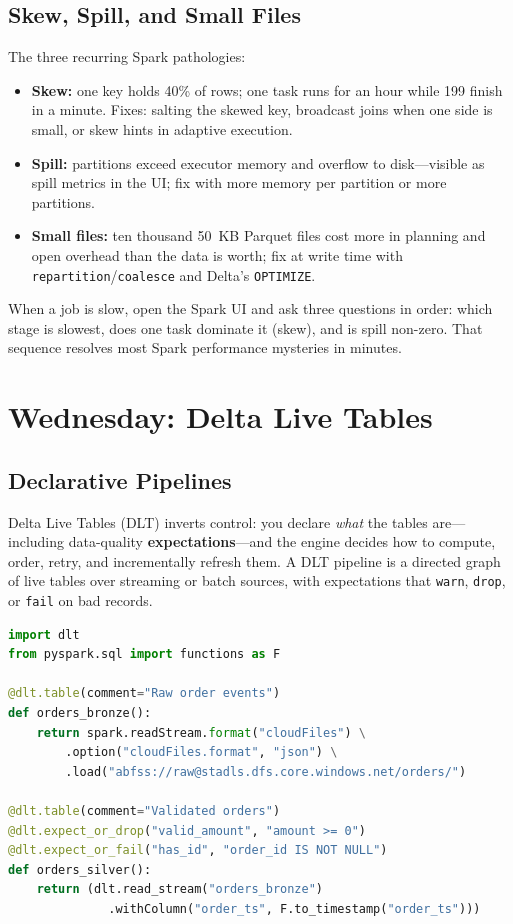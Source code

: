 \subsection{Skew, Spill, and Small Files}
The three recurring Spark pathologies:
\begin{itemize}
    \item \textbf{Skew:} one key holds 40\% of rows; one task runs for an hour while 199 finish in a minute. Fixes: salting the skewed key, broadcast joins when one side is small, or skew hints in adaptive execution.
    \item \textbf{Spill:} partitions exceed executor memory and overflow to disk---visible as spill metrics in the UI; fix with more memory per partition or more partitions.
    \item \textbf{Small files:} ten thousand 50~KB Parquet files cost more in planning and open overhead than the data is worth; fix at write time with \texttt{repartition}/\texttt{coalesce} and Delta's \texttt{OPTIMIZE}.
\end{itemize}

\begin{tipbox}
When a job is slow, open the Spark UI and ask three questions in order: which stage is slowest, does one task dominate it (skew), and is spill non-zero. That sequence resolves most Spark performance mysteries in minutes.
\end{tipbox}

\section{Wednesday: Delta Live Tables}

\subsection{Declarative Pipelines}
Delta Live Tables (DLT) inverts control: you declare \emph{what} the tables are---including data-quality \textbf{expectations}---and the engine decides how to compute, order, retry, and incrementally refresh them. A DLT pipeline is a directed graph of live tables over streaming or batch sources, with expectations that \texttt{warn}, \texttt{drop}, or \texttt{fail} on bad records.

\begin{lstlisting}[language=Python,caption={A Delta Live Tables bronze-to-silver hop with expectations.},label={lst:ch9-dlt}]
import dlt
from pyspark.sql import functions as F

@dlt.table(comment="Raw order events")
def orders_bronze():
    return spark.readStream.format("cloudFiles") \
        .option("cloudFiles.format", "json") \
        .load("abfss://raw@stadls.dfs.core.windows.net/orders/")

@dlt.table(comment="Validated orders")
@dlt.expect_or_drop("valid_amount", "amount >= 0")
@dlt.expect_or_fail("has_id", "order_id IS NOT NULL")
def orders_silver():
    return (dlt.read_stream("orders_bronze")
              .withColumn("order_ts", F.to_timestamp("order_ts")))
\end{lstlisting}

